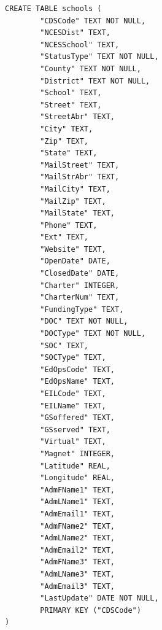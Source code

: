 \documentclass[
  letterpaper,
  DIV=11,
  numbers=noendperiod]{scrartcl}
\begin{document}
\begin{verbatim}
CREATE TABLE schools (
        "CDSCode" TEXT NOT NULL, 
        "NCESDist" TEXT, 
        "NCESSchool" TEXT, 
        "StatusType" TEXT NOT NULL, 
        "County" TEXT NOT NULL, 
        "District" TEXT NOT NULL, 
        "School" TEXT, 
        "Street" TEXT, 
        "StreetAbr" TEXT, 
        "City" TEXT, 
        "Zip" TEXT, 
        "State" TEXT, 
        "MailStreet" TEXT, 
        "MailStrAbr" TEXT, 
        "MailCity" TEXT, 
        "MailZip" TEXT, 
        "MailState" TEXT, 
        "Phone" TEXT, 
        "Ext" TEXT, 
        "Website" TEXT, 
        "OpenDate" DATE, 
        "ClosedDate" DATE, 
        "Charter" INTEGER, 
        "CharterNum" TEXT, 
        "FundingType" TEXT, 
        "DOC" TEXT NOT NULL, 
        "DOCType" TEXT NOT NULL, 
        "SOC" TEXT, 
        "SOCType" TEXT, 
        "EdOpsCode" TEXT, 
        "EdOpsName" TEXT, 
        "EILCode" TEXT, 
        "EILName" TEXT, 
        "GSoffered" TEXT, 
        "GSserved" TEXT, 
        "Virtual" TEXT, 
        "Magnet" INTEGER, 
        "Latitude" REAL, 
        "Longitude" REAL, 
        "AdmFName1" TEXT, 
        "AdmLName1" TEXT, 
        "AdmEmail1" TEXT, 
        "AdmFName2" TEXT, 
        "AdmLName2" TEXT, 
        "AdmEmail2" TEXT, 
        "AdmFName3" TEXT, 
        "AdmLName3" TEXT, 
        "AdmEmail3" TEXT, 
        "LastUpdate" DATE NOT NULL, 
        PRIMARY KEY ("CDSCode")
)


\end{verbatim}
\end{document}
